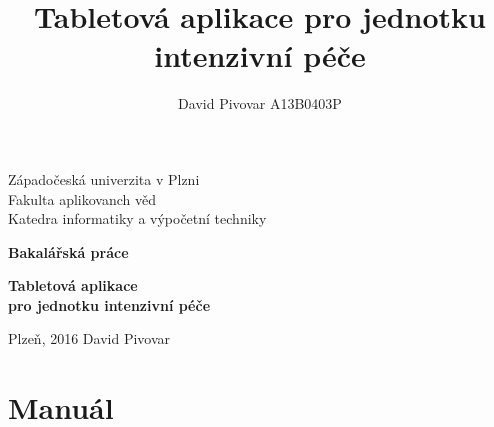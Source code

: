 \documentclass[12pt, a4paper]{report}
\title{Tabletová aplikace pro jednotku intenzivní péče}
\author{David Pivovar A13B0403P}
\begin{document}
\begin{titlepage}

\begin{center}
	
	{\fontsize{22}{0} \selectfont
		Západočeská univerzita v Plzni\\
		Fakulta aplikovanch věd\\
		Katedra informatiky a výpočetní techniky\\
	}
	
	\vfill
	\vfill
	
	{\fontsize{28}{0} \textbf{
		Bakalářská práce\\
	}}
	
	\vfill
	
	{\fontsize{36}{0} \textbf{
		Tabletová aplikace\\pro jednotku intenzivní péče
	}}

\end{center}

\vfill
\vfill
\vfill
\vfill

\begin{flushleft}

	{\fontsize{16}{0} \selectfont
		Plzeň, 2016
		\hfill
		David Pivovar
	}
	
\end{flushleft}

\end{titlepage}




\tableofcontents

\setlength{\parskip}{1em}

\setlength{\parskip}{1em}





%
%


\listoffigures


\chapter*{Manuál}

\end{document}
